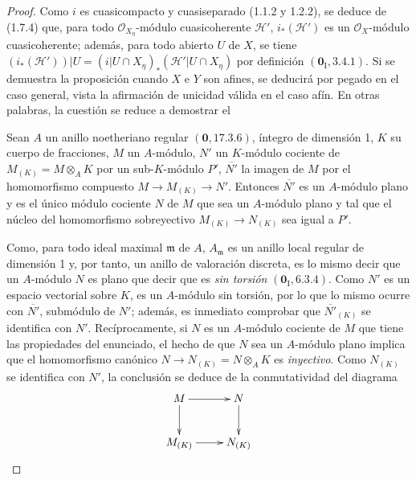 \begin{proof}
Como $i$ es cuasicompacto y cuasiseparado (1.1.2 y 1.2.2), se deduce de
(1.7.4) que, para todo $\mathcal O_{X_\eta}$-módulo cuasicoherente
$\mathcal H'$, $i_*(\mathcal H')$ es un $\mathcal O_X$-módulo
cuasicoherente; además, para todo abierto $U$ de $X$, se tiene
$(i_*(\mathcal H'))|U=(i|U\cap X_\eta)_*(\mathcal H'|U\cap X_\eta)$
por definición $(\mathbf{0}_{\mathrm I},3.4.1)$. Si se demuestra la proposición cuando
$X$ e $Y$ son afines, se deducirá por pegado en el caso general, vista la
afirmación de unicidad válida en el caso afín. En otras palabras, la cuestión se reduce
a demostrar el

\begin{lemma}[2.8.1.1]
\label{IV.2.8.1.1-fr}
Sean $A$ un anillo noetheriano regular $(\mathbf{0},17.3.6)$, íntegro de dimensión
1, $K$ su cuerpo de fracciones, $M$ un $A$-módulo, $N'$ un $K$-módulo
cociente de $M_{(K)}=M\otimes_A K$ por un sub-$K$-módulo $P'$,
$\overline{N'}$ la imagen de $M$ por el homomorfismo compuesto
$M\to M_{(K)}\to N'$. Entonces $\overline{N'}$ es un $A$-módulo plano y es
el único módulo cociente $N$ de $M$ que sea un $A$-módulo plano y tal que el
núcleo del homomorfismo sobreyectivo $M_{(K)}\to N_{(K)}$ sea igual a $P'$.
\end{lemma}

Como, para todo ideal maximal $\mathfrak m$ de $A$, $A_{\mathfrak m}$ es un
anillo local regular de dimensión 1 y, por tanto, un anillo de valoración
discreta, es lo mismo decir que un $A$-módulo $N$ es plano que decir que es
\emph{sin torsión} $(\mathbf{0}_{\mathrm I},6.3.4)$. Como $N'$ es un espacio vectorial
sobre $K$, es un $A$-módulo sin torsión, por lo que lo mismo ocurre con
$\overline{N'}$, submódulo de $N'$; además, es inmediato comprobar que
$\overline{N'}_{(K)}$ se identifica con $N'$. Recíprocamente, si $N$ es un
$A$-módulo cociente de $M$ que tiene las propiedades del enunciado, el hecho de
que $N$ sea un $A$-módulo plano implica que el homomorfismo canónico
$N\to N_{(K)}=N\otimes_A K$ es \emph{inyectivo}. Como $N_{(K)}$ se identifica con
$N'$, la conclusión se deduce de la conmutatividad del diagrama
\[
\xymatrix{
M \ar[r] \ar[d] & N \ar[d] \\
M_{(K)} \ar[r] & N_{(K)}
}
\]
\end{proof}
